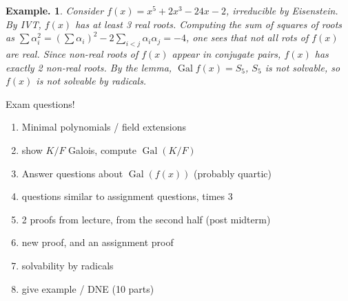 \documentclass[11pt, a4paper]{memoir}
\theoremstyle{change}
\theoremstyle{plain}
\theoremstyle{nonumberplain}
\newtheorem{example}{Example.}
\DeclareMathOperator{\Gal}{Gal}
\numberwithin{equation}{section}
\begin{document}
\begin{example}
    Consider $f(x)=x^5+2x^3-24x-2$, irreducible by Eisenstein.
    By IVT, $f(x)$ has at least 3 real roots.
    Computing the sum of squares of roots as $\sum \alpha_i^2=\left(\sum\alpha_i\right)^2-2\sum_{i<j}\alpha_i\alpha_j=-4$, one sees that not all rots of $f(x)$ are real.
    Since non-real roots of $f(x)$ appear in conjugate pairs, $f(x)$ has exactly 2 non-real roots.
    By the lemma, $\Gal f(x)=S_5$, $S_5$ is not solvable, so $f(x)$ is not solvable by radicals.
\end{example}
Exam questions!
\begin{enumerate}
    \item Minimal polynomials / field extensions
    \item show $K/F$ Galois, compute $\Gal(K/F)$
    \item Answer questions about $\Gal(f(x))$ (probably quartic)
    \item questions similar to assignment questions, times 3
    \item 2 proofs from lecture, from the second half (post midterm)
    \item new proof, and an assignment proof
    \item solvability by radicals
    \item give example / DNE (10 parts)
\end{enumerate}
\end{document}
